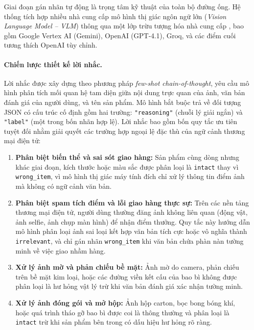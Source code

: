 Giai đoạn gán nhãn tự động là trọng tâm kỹ thuật của toàn bộ
đường ống. Hệ thống tích hợp nhiều nhà cung cấp mô hình thị giác ngôn ngữ lớn
(\textit{Vision Language Model -- VLM}) thông qua một lớp trừu tượng hóa nhà cung cấp
, bao gồm Google Vertex AI (Gemini), OpenAI
(GPT-4.1), Groq, và các điểm cuối tương thích OpenAI tùy chỉnh.

\paragraph{Chiến lược thiết kế lời nhắc.}
Lời nhắc được xây dựng theo phương pháp \textit{few-shot chain-of-thought}, yêu cầu mô
hình phân tích mối quan hệ tam diện giữa nội dung trực quan của ảnh, văn bản đánh giá
của người dùng, và tên sản phẩm. Mô hình bắt buộc trả về đối tượng JSON có cấu trúc
cố định gồm hai trường: \texttt{"reasoning"} (chuỗi lý giải ngắn) và \texttt{"label"}
(một trong bốn nhãn hợp lệ). Lời nhắc bao gồm bốn quy tắc ưu tiên tuyệt đối
 nhằm giải quyết các trường hợp ngoại lệ đặc thù của ngữ
cảnh thương mại điện tử:

\begin{enumerate}
    \item \textbf{Phân biệt biến thể và sai sót giao hàng:} Sản phẩm cùng dòng nhưng
    khác giai đoạn, kích thước hoặc màu sắc được phân loại là \texttt{intact} thay vì
    \texttt{wrong\_item}, vì mô hình thị giác máy tính đích chỉ xử lý thông tin điểm
    ảnh mà không có ngữ cảnh văn bản.

    \item \textbf{Phân biệt spam tích điểm và lỗi giao hàng thực sự:} Trên các nền
    tảng thương mại điện tử, người dùng thường đăng ảnh không liên quan (động vật,
    ảnh selfie, ảnh chụp màn hình) để nhận điểm thưởng. Quy tắc này hướng dẫn mô hình
    phân loại ảnh sai loại kết hợp văn bản tích cực hoặc vô nghĩa thành
    \texttt{irrelevant}, và chỉ gán nhãn \texttt{wrong\_item} khi văn bản chứa phàn
    nàn tường minh về việc giao nhầm hàng.

    \item \textbf{Xử lý ảnh mờ và phản chiếu bề mặt:} Ảnh mờ do camera, phản chiếu
    trên bề mặt kim loại, hoặc các đường viền kết cấu của bao bì không được phân loại
    là hư hỏng vật lý trừ khi văn bản đánh giá xác nhận tường minh.

    \item \textbf{Xử lý ảnh đóng gói và mở hộp:} Ảnh hộp carton, bọc bong bóng khí,
    hoặc quá trình tháo gỡ bao bì được coi là thông thường và phân loại là
    \texttt{intact} trừ khi sản phẩm bên trong có dấu hiệu hư hỏng rõ ràng.
\end{enumerate}


